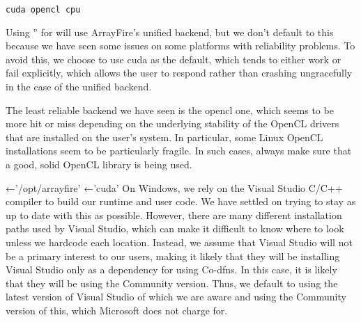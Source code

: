 \documentclass{article}%
\begin{document}
\begin{verbatim}
cuda opencl cpu
\end{verbatim}

\noindent
Using {\Tt{}''\nwendquote} for {\Tt{}\nwendquote} will use ArrayFire's unified backend,
but we don't default to this because we have seen some issues on 
some platforms with reliability problems.
To avoid this, we choose to use {\Tt{}cuda\nwendquote} as the default,
which tends to either work or fail explicitly, 
which allows the user to respond rather than crashing 
ungracefully in the case of the unified backend.

The least reliable backend we have seen is the {\Tt{}opencl\nwendquote} one, 
which seems to be more hit or miss depending on the underlying
stability of the OpenCL drivers that are installed on the user's
system.
In particular, some Linux OpenCL installations seem to be 
particularly fragile.
In such cases, always make sure that a good, solid OpenCL library
is being used.

\nwenddocs{}\plusendmoddef\nwstartdeflinemarkup{}\nwenddeflinemarkup
{}←'/opt/arrayfire'
←'cuda'
\eatline
{}\nwendcode{}\nwdocspar
\noindent
On Windows, we rely on the Visual Studio C/C++ compiler to build
our runtime and user code.
We have settled on trying to stay as up to date with this as 
possible. 
However, there are many different installation paths used by 
Visual Studio, which can make it difficult to know where to look
unless we hardcode each location.
Instead, we assume that Visual Studio will not be a primary 
interest to our users,
making it likely that they will be installing Visual Studio 
only as a dependency for using Co-dfns.
In this case, it is likely that they will be using the Community 
version.
Thus, we default to using the latest version of Visual Studio 
of which we are aware and using the Community version of this,
which Microsoft does not charge for.
\end{document}

